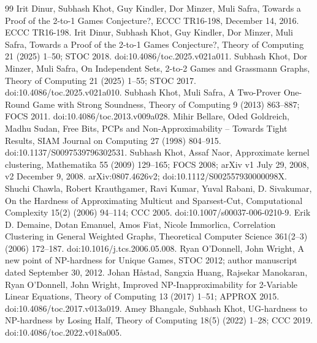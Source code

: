 \documentclass[11pt]{article}
\begin{document}
\begin{thebibliography}{99}
\small
{} Irit Dinur, Subhash Khot, Guy Kindler, Dor Minzer, Muli Safra, Towards a Proof of the 2-to-1 Games Conjecture?, ECCC TR16-198, December 14, 2016. ECCC TR16-198.
 Irit Dinur, Subhash Khot, Guy Kindler, Dor Minzer, Muli Safra, Towards a Proof of the 2-to-1 Games Conjecture?, Theory of Computing 21 (2025) 1--50; STOC 2018. doi:10.4086/toc.2025.v021a011.
 Subhash Khot, Dor Minzer, Muli Safra, On Independent Sets, 2-to-2 Games and Grassmann Graphs, Theory of Computing 21 (2025) 1--55; STOC 2017. doi:10.4086/toc.2025.v021a010.
 Subhash Khot, Muli Safra, A Two-Prover One-Round Game with Strong Soundness, Theory of Computing 9 (2013) 863--887; FOCS 2011. doi:10.4086/toc.2013.v009a028.
 Mihir Bellare, Oded Goldreich, Madhu Sudan, Free Bits, PCPs and Non-Approximability -- Towards Tight Results, SIAM Journal on Computing 27 (1998) 804--915. doi:10.1137/S0097539796302531.
 Subhash Khot, Assaf Naor, Approximate kernel clustering, Mathematika 55 (2009) 129--165; FOCS 2008; arXiv v1 July 29, 2008, v2 December 9, 2008. arXiv:0807.4626v2; doi:10.1112/S002557930000098X.
 Shuchi Chawla, Robert Krauthgamer, Ravi Kumar, Yuval Rabani, D. Sivakumar, On the Hardness of Approximating Multicut and Sparsest-Cut, Computational Complexity 15(2) (2006) 94--114; CCC 2005. doi:10.1007/s00037-006-0210-9.
 Erik D. Demaine, Dotan Emanuel, Amos Fiat, Nicole Immorlica, Correlation Clustering in General Weighted Graphs, Theoretical Computer Science 361(2--3) (2006) 172--187. doi:10.1016/j.tcs.2006.05.008.
 Ryan O'Donnell, John Wright, A new point of NP-hardness for Unique Games, STOC 2012; author manuscript dated September 30, 2012.
 Johan Håstad, Sangxia Huang, Rajsekar Manokaran, Ryan O'Donnell, John Wright, Improved NP-Inapproximability for 2-Variable Linear Equations, Theory of Computing 13 (2017) 1--51; APPROX 2015. doi:10.4086/toc.2017.v013a019.
 Amey Bhangale, Subhash Khot, UG-hardness to NP-hardness by Losing Half, Theory of Computing 18(5) (2022) 1--28; CCC 2019. doi:10.4086/toc.2022.v018a005.

\end{thebibliography}
\end{document}

